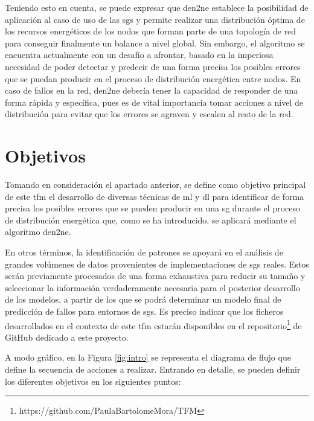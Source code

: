\pagebreak

Teniendo esto en cuenta, se puede expresar que \gls{den2ne} establece la posibilidad de aplicación al caso de uso de las \gls{sg}s y permite realizar una distribución óptima de los recursos energéticos de los nodos que forman parte de una topología de red para conseguir finalmente un balance a nivel global. Sin embargo, el algoritmo se encuentra actualmente con un desafío a afrontar, basado en la imperiosa necesidad de poder detectar y predecir de una forma precisa los posibles errores que se puedan producir en el proceso de distribución energética entre nodos. En caso de fallos en la red, \gls{den2ne} debería tener la capacidad de responder de una forma rápida y específica, pues es de vital importancia tomar acciones a nivel de distribución para evitar que los errores se agraven y escalen al resto de la red.

\vspace{3mm}

\section{Objetivos}
\label{sec:obj}

Tomando en consideración el apartado anterior, se define como objetivo principal de este \gls{tfm} el desarrollo de diversas técnicas de \gls{ml} y \gls{dl} para identificar de forma precisa los posibles errores que se pueden producir en una \gls{sg} durante el proceso de distribución energética que, como se ha introducido, se aplicará mediante el algoritmo \gls{den2ne}. 

\vspace{3mm}

En otros términos, la identificación de patrones se apoyará en el análisis de grandes volúmenes de datos provenientes de implementaciones de \gls{sg}s reales. Estos serán previamente procesados de una forma exhaustiva para reducir su tamaño y seleccionar la información verdaderamente necesaria para el posterior desarrollo de los modelos, a partir de los que se podrá  determinar un modelo final de predicción de fallos para entornos de \gls{sg}s. Es preciso indicar que los ficheros desarrollados en el contexto de este \gls{tfm} estarán disponibles en el repositorio\footnote{https://github.com/PaulaBartolomeMora/TFM} de GitHub dedicado a este proyecto. 

\vspace{3mm}

A modo gráfico, en la Figura \ref{fig:intro} se representa el diagrama de flujo que define la secuencia de acciones a realizar. Entrando en detalle, se pueden definir los diferentes objetivos en los siguientes puntos:

